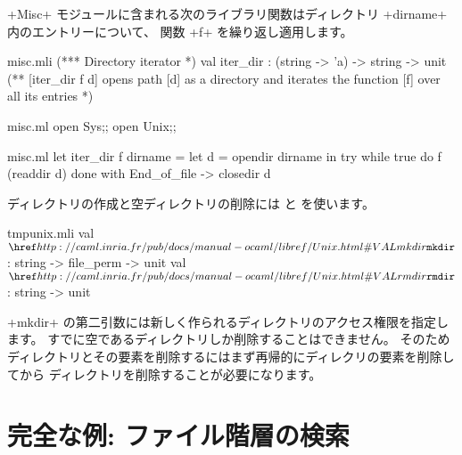 \begin{example}
\ml+Misc+ モジュールに含まれる次のライブラリ関数はディレクトリ \ml+dirname+ 内のエントリーについて、
関数 \ml+f+ を繰り返し適用します。
%
\begin{codefile}{misc.mli}
(*** Directory iterator *)
val iter_dir : (string -> 'a) -> string -> unit
(** [iter_dir f d] opens path [d] as a directory and iterates the
function [f] over all its entries *)
\end{codefile}
%
\begin{codefile}{misc.ml}
open Sys;;
open Unix;;
\end{codefile}
%
\begin{listingcodefile}{misc.ml}
let iter_dir f dirname =
  let d = opendir dirname in
  try while true do f (readdir d) done
  with End_of_file -> closedir d
\end{listingcodefile}
\end{example}

ディレクトリの作成と空ディレクトリの削除には  と  を使います。
%
\begin{listingcodefile}{tmpunix.mli}
val $\libvalue{Unix}{mkdir}$ : string -> file_perm -> unit
val $\libvalue{Unix}{rmdir}$ : string -> unit
\end{listingcodefile}
%
\ml+mkdir+ の第二引数には新しく作られるディレクトリのアクセス権限を指定します。
すでに空であるディレクトリしか削除することはできません。
そのためディレクトリとその要素を削除するにはまず再帰的にディレクリの要素を削除してから
ディレクトリを削除することが必要になります。

\section{\label{ex/find}完全な例: ファイル階層の検索}

